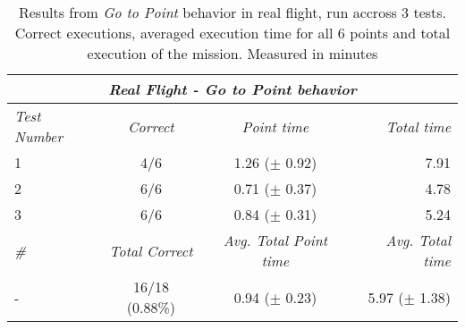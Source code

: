 \begin{table}[!h]
  \centering
  \begin{tabular}{lccr} \toprule
    \multicolumn{4}{c}{\textit{Real Flight - Go to Point behavior}}                        \\ \midrule
    \textit{Test Number} & \textit{Correct} & \textit{Point time} & \textit{Total time} \\ \midrule
      1 & 4/6 & 1.26 ($\pm$ 0.92) & 7.91 \\ \hline
      2 & 6/6 & 0.71 ($\pm$ 0.37) & 4.78 \\ \hline
      3 & 6/6 & 0.84 ($\pm$ 0.31) & 5.24 \\ \hline
      \textit{\#} & \textit{Total Correct} & \textit{Avg. Total Point time} & \textit{Avg. Total time} \\ \midrule
      - & 16/18 (0.88\%) & 0.94 ($\pm$ 0.23) & 5.97 ($\pm$ 1.38) \\ \bottomrule
      \hline
  \end{tabular}
  \caption{Results from \textit{Go to Point} behavior in real flight, run accross 3 tests. Correct executions, averaged execution time for all 6 points and total execution of the mission. Measured in minutes}
  \label{ch_5:table:real_flight_results}
\end{table}
